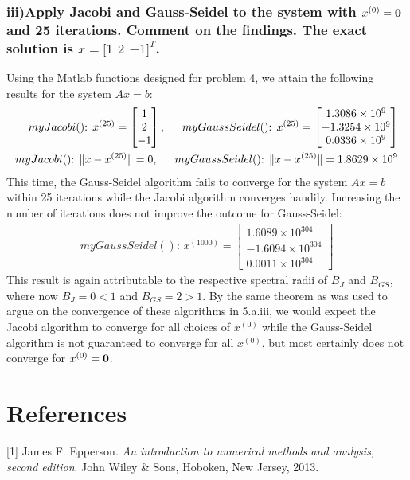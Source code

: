 \documentclass[11pt, letterpaper]{article}
\begin{document}
\subsubsection*{iii)\normalfont Apply Jacobi and Gauss-Seidel to the system with $x^{(0)}={\bf0}$ and 25 iterations.
Comment on the findings. The exact solution is $x=[1$ $2$ $-1]^T$.}
Using the Matlab functions designed for problem 4, we attain the following results for the system $Ax=b$:
\begin{align*}
    \text{$myJacobi()$: }x^{(25)}=
    \begin{bmatrix}
        1\\
        2\\
        -1
    \end{bmatrix}
    ,\indent \text{$myGaussSeidel()$: }x^{(25)}=
    \begin{bmatrix}
        1.3086\times 10^9\\
        -1.3254\times 10^9\\
        0.0336\times 10^9
    \end{bmatrix}\\
    \text{$myJacobi()$: }\|x-x^{(25)}\|=0
    ,\indent\text{$myGaussSeidel()$: }\|x-x^{(25)}\|=1.8629\times 10^9
\end{align*}
This time, the Gauss-Seidel algorithm fails to converge for the system $Ax=b$ within 25 iterations while the Jacobi 
algorithm converges handily. Increasing the number of iterations does not improve the outcome for Gauss-Seidel:
\begin{align*}
    \text{$myGaussSeidel()$: }x^{(1000)}=
    \begin{bmatrix}
        1.6089\times10^{304}\\
        -1.6094\times10^{304}\\
        0.0011\times10^{304}
    \end{bmatrix}
\end{align*}
This result is again attributable to the respective spectral radii of $B_J$ and $B_{GS}$, where now 
$B_J=0<1$ and $B_{GS}=2>1$. By the same theorem as was used to argue on the convergence of these algorithms
in 5.a.iii, we would expect the Jacobi algorithm to converge for all choices of $x^{(0)}$ while the 
Gauss-Seidel algorithm is not guaranteed to converge for all $x^{(0)}$, but most certainly does not converge
for $x^{(0)}={\bf0}$.
\section*{References}
[1] James F. Epperson. {\it An introduction to numerical methods and analysis, second edition}. John Wiley \& Sons, Hoboken, New
Jersey, 2013.
\end{document}
